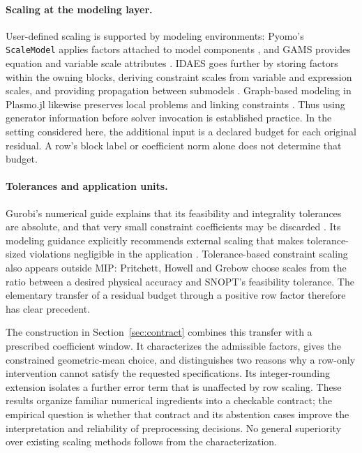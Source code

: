 \paragraph{Scaling at the modeling layer.}
User-defined scaling is supported by modeling environments: Pyomo's
\texttt{ScaleModel} applies factors attached to model components
\cite{pyomoScaleModel}, and GAMS provides equation and variable scale attributes
\cite{gamsScaling}. IDAES goes further by storing factors within the owning blocks,
deriving constraint scales from variable and expression scales, and providing
propagation between submodels \cite{idaesScaling,idaesCustomScaler}. Graph-based
modeling in Plasmo.jl likewise preserves local problems and linking constraints
\cite{jalving2022plasmo}. Thus using generator information before solver invocation
is established practice. In the setting considered here, the additional input is a
declared budget for each original residual. A row's block label or coefficient norm
alone does not determine that budget.

\paragraph{Tolerances and application units.}
Gurobi's numerical guide explains that its feasibility and integrality tolerances
are absolute, and that very small constraint coefficients may be discarded
\cite{gurobiScaling}. Its modeling guidance explicitly recommends external scaling
that makes tolerance-sized violations negligible in the application
\cite{gurobiExternalScaling}. Tolerance-based constraint scaling also appears
outside MIP: Pritchett, Howell and Grebow \cite{pritchett2017scaling} choose scales
from the ratio between a desired physical accuracy and SNOPT's feasibility
tolerance. The elementary transfer of a residual budget through a positive row
factor therefore has clear precedent.

The construction in Section~\ref{sec:contract} combines this transfer with a
prescribed coefficient window. It characterizes the admissible factors, gives the
constrained geometric-mean choice, and distinguishes two reasons why a row-only
intervention cannot satisfy the requested specifications. Its integer-rounding
extension isolates a further error term that is unaffected by row scaling. These
results organize familiar numerical ingredients into a checkable contract; the
empirical question is whether that contract and its abstention cases improve the
interpretation and reliability of preprocessing decisions. No general superiority
over existing scaling methods follows from the characterization.


